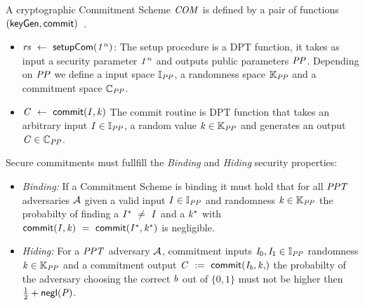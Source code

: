 \begin{definition}\label{def:pre:commitment}
    A cryptographic Commitment Scheme $\mathit{COM}$ is defined by a pair of functions $(\mathsf{keyGen}, \mathsf{commit})$~\cite{bunz2018bulletproofs}.
    \begin{itemize}
        \item $\mathit{rs} ~\leftarrow~ \mathsf{setupCom} (\mathit{1^n})$: The setup procedure is a DPT function, it takes as input a security parameter $\mathit{1^n}$ and outputs public parameters $\mathit{PP}$.
        Depending on $\mathit{PP}$ we define a input space $\mathbb{I}_{\mathit{PP}}$, a randomness space $\mathbb{K}_{\mathit{PP}}$ and a commitment space $\mathbb{C}_{\mathit{PP}}$.
        \item $\mathit{C} ~\leftarrow~ \mathsf{commit}(\mathit{I}, \mathit{k})$ The commit routine is DPT function that takes an arbitrary input $\mathit{I} \in \mathbb{I}_{\mathit{PP}}$, a random value $\mathit{k} \in \mathbb{K}_{\mathit{PP}}$ and
        generates an output $\mathit{C} \in \mathbb{C}_{\mathit{PP}}$.
    \end{itemize}

    Secure commitments must fullfill the \emph{Binding} and \emph{Hiding} security properties:
    \begin{itemize}
        \item \textit{Binding:} If a Commitment Scheme is binding it must hold that for all $\mathit{PPT}$ adversaries $\mathcal{A}$ given a valid input $\mathit{I} \in \mathbb{I}_{\mathit{PP}}$
        and randomness $\mathit{k} \in \mathbb{K}_{\mathit{PP}}$ the probabilty of finding a $\mathit{I}^* ~\neq~ \mathit{I}$ and a $\mathit{k}^*$ with
        $\mathsf{commit}(\mathit{I}, \mathit{k}) ~=~ \mathsf{commit}(\mathit{I}^*, \mathit{k}^*)$ is negligible.
        \item \textit{Hiding:} For a $\mathit{PPT}$ adversary $\mathcal{A}$, commitment inputs $\mathit{I}_0, \mathit{I}_1 \in \mathbb{I}_{\mathit{PP}}$ randomness $\mathit{k} \in
       \mathbb{K}_{\mathit{PP}}$ and a commitment output $\varCommitment \opAssign \procCommit{\varInput_{\varB}, \varNonce}$ the probabilty of the adversary choosing the correct $\mathit{b}$ out of $\{0,1\}$
        must not be higher then $\frac{1}{2} + \mathsf{negl}(\mathit{P})$.
    \end{itemize}
\end{definition}

